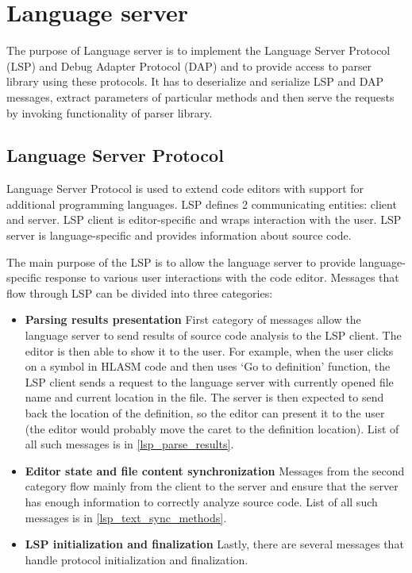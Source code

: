 \chapter{Language server}

The purpose of Language server is to implement the Language Server Protocol (LSP) and Debug Adapter Protocol (DAP) and to provide access to parser library using these protocols. It has to deserialize and serialize LSP and DAP messages, extract parameters of particular methods and then serve the requests by invoking functionality of parser library.

\section{Language Server Protocol}
Language Server Protocol is used to extend code editors with support for additional programming languages. LSP defines 2 communicating entities: client and server. LSP client is editor-specific and wraps interaction with the user. LSP server is language-specific and provides information about source code.

The main purpose of the LSP is to allow the language server to provide language-specific response to various user interactions with the code editor. Messages that flow through LSP can be divided into three categories:

\begin{itemize}
	\item \textbf{Parsing results presentation} First category of messages allow the language server to send results of source code analysis to the LSP client. The editor is then able to show it to the user. For example, when the user clicks on a symbol in HLASM code and then uses `Go to definition' function, the LSP client sends a request to the language server with currently opened file name and current location in the file. The server is then expected to send back the location of the definition, so the editor can present it to the user (the editor would probably move the caret to the definition location). List of all such messages is in \cref{lsp_parse_results}.

	\item \textbf{Editor state and file content synchronization} Messages from the second category flow mainly from the client to the server and ensure that the server has enough information to correctly analyze source code. List of all such messages is in \cref{lsp_text_sync_methods}.
	
	\item \textbf{LSP initialization and finalization} Lastly, there are several messages that handle protocol initialization and finalization.
\end{itemize}



